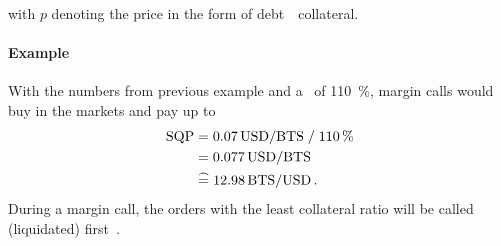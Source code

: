 with $p$ denoting the price in the form of \si{debt \per collateral}. 

\paragraph{Example}
With the numbers from previous example and a \MSQR\ of
\SI{110}{\percent}, margin calls would buy in the markets and pay up to
\begin{align}
 \text{SQP} &= \SI{0.07}{USD \per BTS} \;/\; \SI{110}{\percent} \\
      &= \SI{0.077}{USD \per BTS} \\
      &\stackrel{\frown}{=} \SI{12.98}{BTS \per USD}\,.
\end{align}
During a margin call, the orders with the least collateral ratio will be called (liquidated)
first~\cite{bsip34}.
